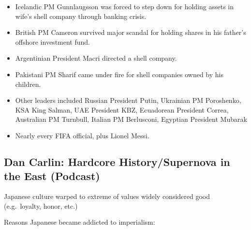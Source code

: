 \documentclass[
]{article}
\begin{document}
\begin{itemize}
\item
  Icelandic PM Gunnlaugsson was forced to step down for holding assets
  in wife's shell company through banking crisis.
\item
  British PM Cameron survived major scandal for holding shares in his
  father's offshore investment fund.
\item
  Argentinian President Macri directed a shell company.
\item
  Pakistani PM Sharif came under fire for shell companies owned by his
  children.
\item
  Other leaders included Russian President Putin, Ukrainian PM
  Poroshenko, KSA King Salman, UAE President KBZ, Ecuadorean President
  Correa, Australian PM Turnbull, Italian PM Berlusconi, Egyptian
  President Mubarak
\item
  Nearly every FIFA official, plus Lionel Messi.
\end{itemize}

\hypertarget{dan-carlin-hardcore-historysupernova-in-the-east-podcast}{%
\subsection{Dan Carlin: Hardcore History/Supernova in the East
(Podcast)}\label{dan-carlin-hardcore-historysupernova-in-the-east-podcast}}

Japanese culture warped to extreme of values widely considered good
(e.g.~loyalty, honor, etc.)

Reasons Japanese became addicted to imperialism:
\end{document}
